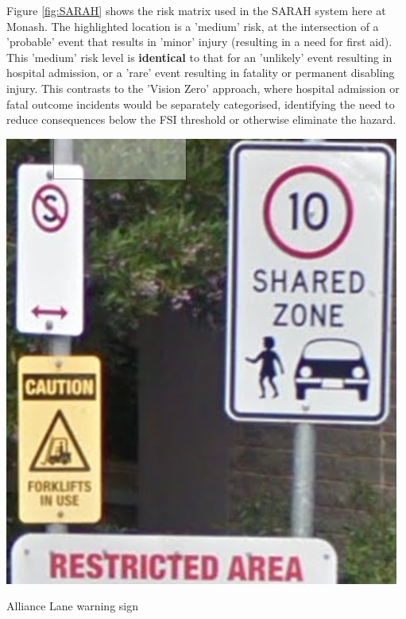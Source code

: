 \documentclass{tufte-handout}
\begin{document}
 Figure \ref{fig:SARAH} shows the risk matrix used in the SARAH system here at Monash.  The highlighted location is a 'medium' risk, at the intersection of a 'probable' event that results in 'minor' injury (resulting in a need for first aid).  This 'medium' risk level is \textbf{identical} to that for an 'unlikely' event resulting in hospital admission, or a 'rare' event resulting in fatality or permanent disabling injury. This contrasts to the  'Vision Zero' approach, where hospital admission or fatal outcome incidents would be separately categorised, identifying the need to reduce consequences below the FSI threshold or otherwise eliminate the hazard. 



\begin{marginfigure}
\includegraphics{Alliance_lane_forklifts}
\caption{Alliance Lane warning sign}
\label{fig:Alliance_lane_forklifts}
\end{marginfigure}
\end{document}
